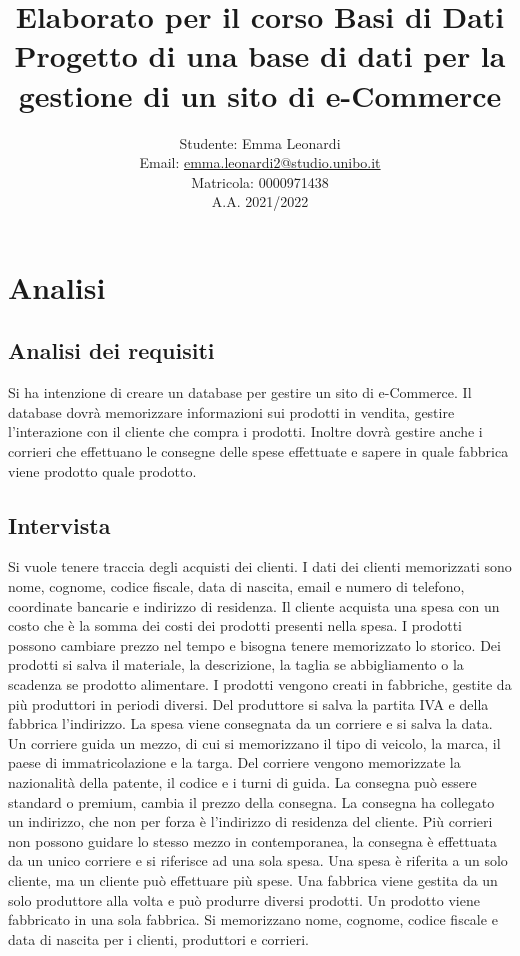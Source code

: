\documentclass{report}
\title{Elaborato per il corso Basi di Dati\\ \small Progetto di una base di dati per la gestione di un sito di e-Commerce}
\author{
    Studente: Emma Leonardi\\
    Email: \url{emma.leonardi2@studio.unibo.it}\\
    Matricola: 0000971438\\
    A.A. 2021/2022
    }
\date{}
\begin{document}
\maketitle
\tableofcontents

\chapter{Analisi}
\section{Analisi dei requisiti}
Si ha intenzione di creare un database per gestire un sito di e-Commerce.
Il database dovrà memorizzare informazioni sui prodotti in vendita, gestire l'interazione con il cliente che compra i prodotti. 
Inoltre dovrà gestire anche i corrieri che effettuano le consegne delle spese effettuate e sapere in quale fabbrica viene prodotto quale prodotto.
\section{Intervista}
Si vuole tenere traccia degli acquisti dei clienti. I dati dei clienti memorizzati sono nome, cognome, codice fiscale, data di nascita, email e numero di telefono, coordinate bancarie e indirizzo di residenza.
Il cliente acquista una spesa con un costo che è la somma dei costi dei prodotti presenti nella spesa. 
I prodotti possono cambiare prezzo nel tempo e bisogna tenere memorizzato lo storico. Dei prodotti si salva il materiale, la descrizione, la taglia se abbigliamento o la scadenza se prodotto alimentare. 
I prodotti vengono creati in fabbriche, gestite da più produttori in periodi diversi. Del produttore si salva la partita IVA e della fabbrica l'indirizzo. 
La spesa viene consegnata da un corriere e si salva la data. Un corriere guida un mezzo, di cui si memorizzano il tipo di veicolo, la marca, il paese di immatricolazione e la targa.
Del corriere vengono memorizzate la nazionalità della patente, il codice e i turni di guida. La consegna può essere standard o premium, cambia il prezzo della consegna.
La consegna ha collegato un indirizzo, che non per forza è l'indirizzo di residenza del cliente. Più corrieri non possono guidare lo stesso mezzo in contemporanea, la consegna è effettuata da un unico corriere 
e si riferisce ad una sola spesa. Una spesa è riferita a un solo cliente, ma un cliente può effettuare più spese. Una fabbrica viene gestita da un solo produttore alla volta e può produrre diversi prodotti. 
Un prodotto viene fabbricato in una sola fabbrica. Si memorizzano nome, cognome, codice fiscale e data di nascita per i clienti, produttori e corrieri.
\end{document}
